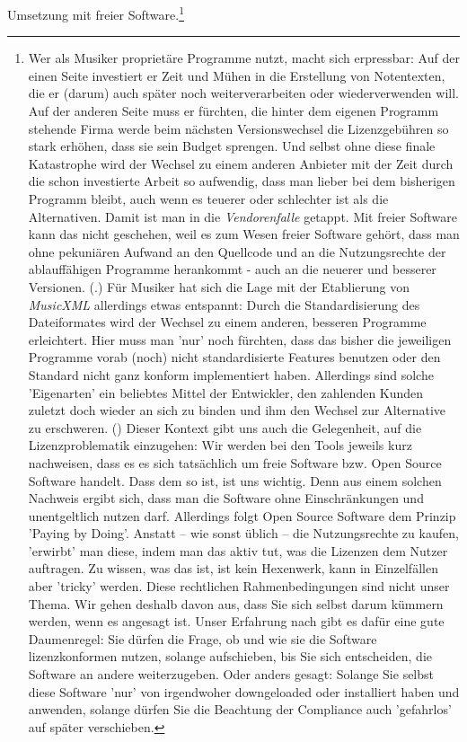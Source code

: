 Umsetzung mit freier Software.\footnote{Wer als Musiker proprietäre Programme
nutzt, macht sich erpressbar: Auf der einen Seite investiert er Zeit und Mühen
in die Erstellung von Notentexten, die er (darum) auch später noch
weiterverarbeiten oder wiederverwenden will. Auf der anderen Seite muss er
fürchten, die hinter dem eigenen Programm stehende Firma werde beim nächsten
Versionswechsel die Lizenzgebühren so stark erhöhen, dass sie sein Budget
sprengen. Und selbst ohne diese finale Katastrophe wird der Wechsel zu einem
anderen Anbieter mit der Zeit durch die schon investierte Arbeit so aufwendig,
dass man lieber bei dem bisherigen Programm bleibt, auch wenn es teuerer oder
schlechter ist als die Alternativen. Damit ist man in die \textit{Vendorenfalle}
getappt. Mit freier Software kann das nicht geschehen, weil es zum Wesen freier
Software gehört, dass man ohne pekuniären Aufwand an den Quellcode und an die
Nutzungsrechte der ablauffähigen Programme herankommt - auch an die neuerer und
besserer Versionen. (\cite[vgl. dazu][\nopage wp]{FSF2018a}.) Für Musiker hat
sich die Lage mit der Etablierung von \textit{MusicXML} allerdings etwas
entspannt: Durch die Standardisierung des Dateiformates wird der Wechsel zu
einem anderen, besseren Programme erleichtert. Hier muss man 'nur' noch
fürchten, dass das bisher die jeweiligen Programme vorab (noch) nicht
standardisierte Features benutzen oder den Standard nicht ganz konform
implementiert haben. Allerdings sind solche 'Eigenarten' ein beliebtes Mittel
der Entwickler, den zahlenden Kunden zuletzt doch wieder an sich zu binden und
ihm den Wechsel zur Alternative zu erschweren. (\cite[Zur Lizenzierung von
MusicXML vgl. auch][\nopage wp.]{WpedMusicXML2018a}) Dieser Kontext gibt uns
auch die Gelegenheit, auf die Lizenzproblematik einzugehen: Wir werden bei den
Tools jeweils kurz nachweisen, dass es es sich tatsächlich um freie Software
bzw. Open Source Software handelt. Dass dem so ist, ist uns wichtig. Denn aus
einem solchen Nachweis ergibt sich, dass man die Software ohne Einschränkungen
und unentgeltlich nutzen darf. Allerdings folgt Open Source Software dem Prinzip
'Paying by Doing'. Anstatt -- wie sonst üblich -- die Nutzungsrechte zu kaufen,
'erwirbt' man diese, indem man das aktiv tut, was die Lizenzen dem Nutzer
auftragen. Zu wissen, was das ist, ist kein Hexenwerk, kann in Einzelfällen aber
'tricky' werden. Diese rechtlichen Rahmenbedingungen sind nicht unser Thema. Wir
gehen deshalb davon aus, dass Sie sich selbst darum kümmern werden, wenn es
angesagt ist. Unser Erfahrung nach gibt es dafür eine gute Daumenregel: Sie
dürfen die Frage, ob und wie sie die Software lizenzkonformen nutzen, solange
aufschieben, bis Sie sich entscheiden, die Software an andere weiterzugeben.
Oder anders gesagt: Solange Sie selbst diese Software 'nur' von irgendwoher
downgeloaded oder installiert haben und anwenden, solange dürfen Sie die
Beachtung der Compliance auch 'gefahrlos' auf später verschieben.}

